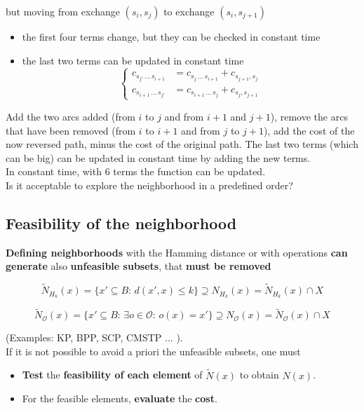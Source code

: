 \documentclass[11pt]{article}
\begin{document}
	but moving from exchange $(s_i , s_j )$ to exchange $(s_i , s_{j+1})$
	\begin{itemize}
		\item the first four terms change, but they can be checked in constant time
		
		\item the last two terms can be updated in constant time
		$$ \begin{cases}
			c_{s_{j'} \, ... \, s_{i+1}} & = c_{s_j \, ... \, s_{i+1}} + c_{s_{j+1},s_j} \\
			c_{s_{i+1} \, ... \, s_{j'}} & = c_{s_{i+1} \, ... \, s_j} + c_{s_j ,s_{j+1}}
		\end{cases}$$
	\end{itemize}
	
	Add the two arcs added (from $i$ to $j$ and from $i+1$ and $j+1$), remove the arcs that have been removed (from $i$ to $i+1$ and from $j$ to $j+1$), add the cost of the now reversed path, minus the cost of the original path. The last two terms (which can be big) can be updated in constant time by adding the new terms.\\
	In constant time, with $6$ terms the function can be updated.\\
	
	Is it acceptable to explore the neighborhood in a predefined order?
	
	\newpage
	
	\subsection{Feasibility of the neighborhood}
	\textbf{Defining neighborhoods} with the Hamming distance or with operations \textbf{can generate} also \textbf{unfeasible subsets}, that \textbf{must be removed}
	
	$$ \tilde{N}_{H_k} (x) = \{x' \subseteq B : \, d (x', x) \leq k \} \supseteq N_{H_k} (x) = \tilde{N}_{H_k} (x) \cap X $$
	
	$$ \tilde{N}_{\mathcal{O}} (x) = \{ x' \subseteq B : \, \exists o \in \mathcal{O} : \, o (x) = x' \} \supseteq N_{\mathcal{O}} (x) = \tilde{N}_{\mathcal{O}} (x) \cap X $$
	
	(Examples: KP, BPP, SCP, CMSTP ... ).\\
	
	If it is not possible to avoid a priori the unfeasible subsets, one must
	\begin{itemize}
		\item \textbf{Test} the \textbf{feasibility of each element} of $\tilde{N} (x)$ to obtain $N (x)$.\\
		
		\item For the feasible elements, \textbf{evaluate} the \textbf{cost}.\\
	\end{itemize}
	
\end{document}
